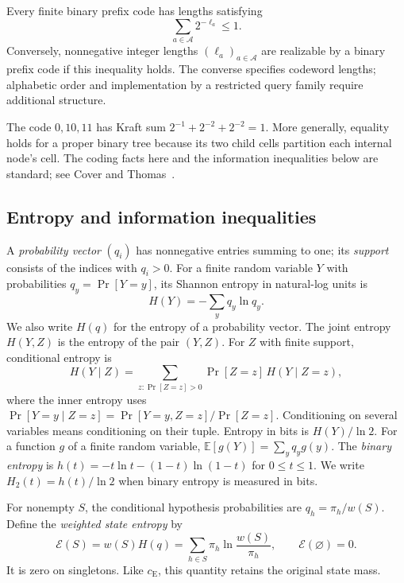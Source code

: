 \begin{theorem}
\label{thm:kraft}
Every finite binary prefix code has lengths satisfying
\[
 \sum_{a\in\mathcal A}2^{-\ell_a}\le1.
\]
Conversely, nonnegative integer lengths $(\ell_a)_{a\in\mathcal A}$
are realizable by a binary prefix code if this inequality holds.
The converse specifies codeword lengths; alphabetic order and
implementation by a restricted query family require additional
structure.
\end{theorem}


The code $0,10,11$ has Kraft sum
$2^{-1}+2^{-2}+2^{-2}=1$. More generally, equality holds for a
proper binary tree because its two child cells partition each
internal node's cell. The coding facts here and the information
inequalities below are standard; see Cover and Thomas~\cite{ct2006}.

\subsection{Entropy and information inequalities}

\begin{definition}\label{def:entropy}
A \emph{probability vector} $(q_i)$ has nonnegative entries summing
to one; its \emph{support} consists of the indices with $q_i>0$.
For a finite random variable $Y$ with probabilities
$q_y=\Pr[Y=y]$, its Shannon entropy in natural-log units is
\[
 H(Y)=-\sum_y q_y\ln q_y.
\]
We also write $H(q)$ for the entropy of a probability vector.
The joint entropy $H(Y,Z)$ is the entropy of the pair $(Y,Z)$.
For $Z$ with finite support, conditional entropy is
\[
 H(Y\mid Z)=
 \sum_{z:\Pr[Z=z]>0}\Pr[Z=z]\,H(Y\mid Z=z),
\]
where the inner entropy uses
$\Pr[Y=y\mid Z=z]=\Pr[Y=y,Z=z]/\Pr[Z=z]$.
Conditioning on several variables means
conditioning on their tuple. Entropy in bits is $H(Y)/\ln2$.
For a function $g$ of a finite random variable,
$\mathbb E[g(Y)]=\sum_y q_y g(y)$.
The \emph{binary entropy} is
$h(t)=-t\ln t-(1-t)\ln(1-t)$ for $0\le t\le1$.
We write $H_2(t)=h(t)/\ln2$ when binary entropy is measured in bits.
\end{definition}

For nonempty $S$, the conditional hypothesis probabilities are
$q_h=\pi_h/w(S)$. Define the \emph{weighted state entropy} by
\[
 \mathcal E(S)=w(S)H(q)
       =\sum_{h\in S}\pi_h\ln\frac{w(S)}{\pi_h},
 \qquad \mathcal E(\varnothing)=0.
\]
It is zero on singletons. Like $c_{\mathrm E}$, this quantity
retains the original state mass.

